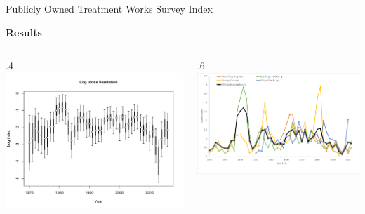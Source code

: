 \documentclass[ignorenonframetext,]{beamer}
\def\begincols{\begin{columns}}
\def\begincol{\begin{column}}
\def\endcol{\end{column}}
\def\endcols{\end{columns}}
\begin{document}
\begin{frame}{Publicly Owned Treatment Works Survey Index}

\textbf{Results}

\begincols
 \begincol{.4\textwidth}
\includegraphics{r4ss/plots_mod1/index4_logcpuedata_Sanitation.png}
\endcol
 \begincol{.6\textwidth}
\includegraphics{Figures/Fleet7_Sanitation_indexcompare.png}

\endcol
\endcols

\end{frame}
\end{document}

